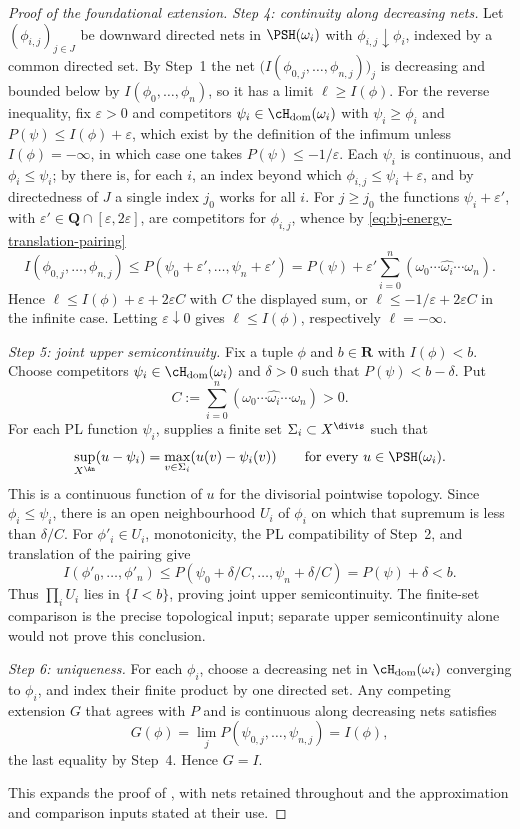 \begin{proof}[Proof of the foundational extension]
\emph{Step 4: continuity along decreasing nets.}  Let
$(\phi_{i,j})_{j\in J}$ be downward directed nets in $\PSH(\omega_i)$
with $\phi_{i,j}\downarrow\phi_i$, indexed by a common directed set.  By
Step~1 the net $\bigl(I(\phi_{0,j},\dots,\phi_{n,j})\bigr)_j$ is
decreasing and bounded below by $I(\phi_0,\dots,\phi_n)$, so it has a
limit $\ell\ge I(\phi)$.  For the reverse inequality, fix
$\varepsilon>0$ and competitors $\psi_i\in\cH_{\mathrm{dom}}(\omega_i)$
with $\psi_i\ge\phi_i$ and $P(\psi)\le I(\phi)+\varepsilon$, which
exist by the definition of the infimum unless $I(\phi)=-\infty$, in which
case one takes $P(\psi)\le-1/\varepsilon$.  Each $\psi_i$ is
continuous, and $\phi_i\le\psi_i$; by  there is, for
each $i$, an index beyond which $\phi_{i,j}\le\psi_i+\varepsilon$, and
by directedness of $J$ a single index $j_0$ works for all $i$.  For
$j\ge j_0$ the functions $\psi_i+\varepsilon'$, with
$\varepsilon'\in\mathbf Q\cap[\varepsilon,2\varepsilon]$, are competitors
for $\phi_{i,j}$, whence by
\eqref{eq:bj-energy-translation-pairing}
\[
 I(\phi_{0,j},\dots,\phi_{n,j})
 \le P(\psi_0+\varepsilon',\dots,\psi_n+\varepsilon')
 =P(\psi)+\varepsilon'\sum_{i=0}^n
   (\omega_0\cdots\widehat{\omega_i}\cdots\omega_n).
\]
Hence $\ell\le I(\phi)+\varepsilon+2\varepsilon C$ with $C$ the
displayed sum, or $\ell\le-1/\varepsilon+2\varepsilon C$ in the infinite
case.  Letting $\varepsilon\downarrow0$ gives $\ell\le I(\phi)$,
respectively $\ell=-\infty$.

\emph{Step 5: joint upper semicontinuity.}
Fix a tuple $\phi$ and $b\in\mathbf R$ with $I(\phi)<b$.
Choose competitors $\psi_i\in\cH_{\mathrm{dom}}(\omega_i)$ and
$\delta>0$ such that $P(\psi)<b-\delta$. Put
\[
 C:=\sum_{i=0}^n(\omega_0\cdots\widehat{\omega_i}\cdots\omega_n)>0.
\]
For each PL function $\psi_i$, \cite[Lemma~4.26]{BJ22} supplies a finite
set $\Sigma_i\subset X^{\divis}$ such that
\[
 \sup_{X^{\An}}(u-\psi_i)=\max_{v\in\Sigma_i}(u(v)-\psi_i(v))
 \qquad\text{for every }u\in\PSH(\omega_i).
\]
This is a continuous function of $u$ for the divisorial pointwise topology.
Since $\phi_i\le\psi_i$, there is an open neighbourhood $U_i$ of
$\phi_i$ on which that supremum is less than $\delta/C$.
For $\phi'_i\in U_i$, monotonicity, the PL compatibility of Step~2, and
translation of the pairing give
\[
 I(\phi'_0,\ldots,\phi'_n)
 \le P(\psi_0+\delta/C,\ldots,\psi_n+\delta/C)
 =P(\psi)+\delta<b.
\]
Thus $\prod_iU_i$ lies in $\{I<b\}$, proving joint upper
semicontinuity. The finite-set comparison is the precise topological input;
separate upper semicontinuity alone would not prove this conclusion.

\emph{Step 6: uniqueness.}
For each $\phi_i$, choose a decreasing net in
$\cH_{\mathrm{dom}}(\omega_i)$ converging to $\phi_i$, and index their
finite product by one directed set. Any competing extension $G$ that
agrees with $P$ and is continuous along decreasing nets satisfies
\[
 G(\phi)=\lim_jP(\psi_{0,j},\ldots,\psi_{n,j})=I(\phi),
\]
the last equality by Step~4. Hence $G=I$.

This expands the proof of \cite[Theorem~7.1]{BJ22}, with nets
retained throughout and the approximation and comparison inputs stated
at their use.
\end{proof}

